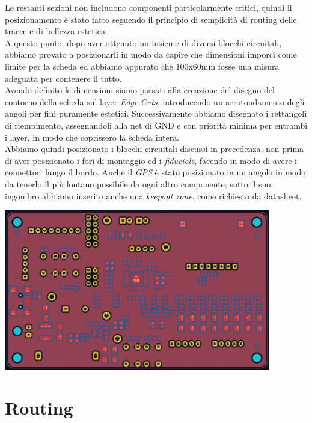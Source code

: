 \noindent Le restanti sezioni non includono componenti particolarmente critici,
quindi il posizionamento è stato fatto seguendo il principio di
semplicità di routing delle tracce e di bellezza estetica.\\
A questo punto, dopo aver ottenuto un insieme di diversi blocchi
circuitali, abbiamo provato a posizionarli in modo da capire che
dimensioni imporci come limite per la scheda ed abbiamo appurato che
100x60mm fosse una misura adeguata per contenere il tutto.\\
Avendo definito le dimensioni siamo passati alla creazione del disegno
del contorno della scheda sul layer \textit{Edge.Cuts}, introducendo un
arrotondamento degli angoli per fini puramente estetici. Successivamente
abbiamo disegnato i rettangoli di riempimento, assegnandoli alla net di
GND e con priorità minima per entrambi i layer, in modo che coprissero
la scheda intera.\\
Abbiamo quindi posizionato i blocchi circuitali discussi in precedenza,
non prima di aver posizionato i fori di montaggio ed i \textit{fiducials},
facendo in modo di avere i connettori lungo il bordo. Anche il \textit{GPS} è
stato posizionato in un angolo in modo da tenerlo il più lontano
possibile da ogni altro componente; sotto il suo ingombro abbiamo
inserito anche una \emph{keepout zone}, come richiesto da datasheet.

\begin{center}
\includegraphics[width=4.57535in,height=2.75694in]{figures/image21.png}
\captionsetup{type=figure}
\end{center}

\hypertarget{routing}{%
\section{Routing}\label{routing}}

